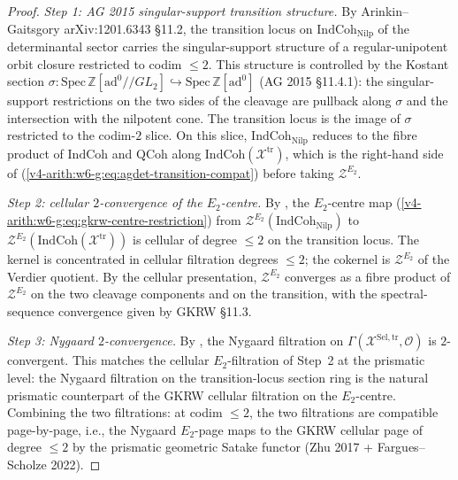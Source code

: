 \begin{proof}
\emph{Step 1: AG 2015 singular-support transition structure.} By
Arinkin--Gaitsgory arXiv:1201.6343 \S 11.2, the transition locus on
\(\mathrm{IndCoh}_{\mathrm{Nilp}}\) of the determinantal sector carries
the singular-support structure of a regular-unipotent orbit closure
restricted to codim \(\leq 2\). This structure is controlled by the
Kostant section
\(\sigma\colon\mathrm{Spec}\,\mathbb{Z}[\mathrm{ad}^{0}//GL_{2}]\hookrightarrow\mathrm{Spec}\,\mathbb{Z}[\mathrm{ad}^{0}]\)
(AG 2015 \S 11.4.1): the singular-support restrictions on the two
sides of the cleavage are pullback along \(\sigma\) and the
intersection with the nilpotent cone. The transition locus is the
image of \(\sigma\) restricted to the codim-\(2\) slice. On this slice,
\(\mathrm{IndCoh}_{\mathrm{Nilp}}\) reduces to the fibre product of
\(\mathrm{IndCoh}\) and \(\mathrm{QCoh}\) along
\(\mathrm{IndCoh}(\mathcal{X}^{\mathrm{tr}})\), which is the
right-hand side of (\ref{v4-arith:w6-g:eq:agdet-transition-compat})
before taking \(\mathcal{Z}^{E_{2}}\).

\emph{Step 2: cellular \(2\)-convergence of the \(E_{2}\)-centre.} By
, the \(E_{2}\)-centre map
(\ref{v4-arith:w6-g:eq:gkrw-centre-restriction}) from
\(\mathcal{Z}^{E_{2}}(\mathrm{IndCoh}_{\mathrm{Nilp}})\) to
\(\mathcal{Z}^{E_{2}}(\mathrm{IndCoh}(\mathcal{X}^{\mathrm{tr}}))\)
is cellular of degree \(\leq 2\) on the transition locus. The kernel
is concentrated in cellular filtration degrees \(\leq 2\); the
cokernel is \(\mathcal{Z}^{E_{2}}\) of the Verdier quotient. By the
cellular presentation, \(\mathcal{Z}^{E_{2}}\) converges as a fibre
product of \(\mathcal{Z}^{E_{2}}\) on the two cleavage components and
on the transition, with the spectral-sequence convergence given by
GKRW \S 11.3.

\emph{Step 3: Nygaard \(2\)-convergence.} By
, the Nygaard filtration on
\(\Gamma(\mathcal{X}^{\mathrm{Sel},\mathrm{tr}},\mathcal{O})\) is
\(2\)-convergent. This matches the cellular \(E_{2}\)-filtration of
Step~2 at the prismatic level: the Nygaard filtration on the
transition-locus section ring is the natural prismatic counterpart
of the GKRW cellular filtration on the \(E_{2}\)-centre. Combining
the two filtrations: at codim \(\leq 2\), the two filtrations are
compatible page-by-page, i.e., the Nygaard \(E_{2}\)-page maps to the
GKRW cellular page of degree \(\leq 2\) by the prismatic geometric
Satake functor (Zhu 2017 + Fargues--Scholze 2022).


\end{proof}
